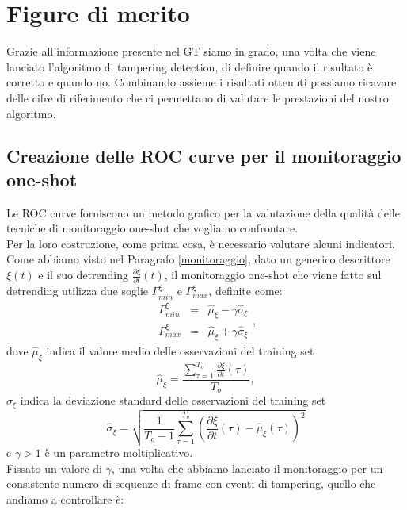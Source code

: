 \section{Figure di merito}
\label{figureDiMerito}
Grazie all'informazione presente nel GT siamo in grado, una volta che viene lanciato l'algoritmo di tampering detection, di definire quando il risultato \`e corretto e quando no.
Combinando assieme i risultati ottenuti possiamo ricavare delle cifre di riferimento che ci permettano di valutare le prestazioni del nostro algoritmo.
\subsection{Creazione delle ROC curve per il monitoraggio one-shot}
\label{metricheOneShot}
Le ROC curve forniscono un metodo grafico per la valutazione della qualit\`a delle tecniche di monitoraggio one-shot che vogliamo confrontare.\\
Per la loro costruzione, come prima cosa, \`e necessario valutare alcuni indicatori.
Come abbiamo visto nel Paragrafo \ref{monitoraggio}, dato un generico descrittore $\xi(t)$ e il suo detrending $\frac{\partial \xi}{\partial t}(t)$, il monitoraggio one-shot che viene fatto sul detrending utilizza due soglie $\Gamma_{min}^\xi$ e $\Gamma_{max}^\xi$, definite come:
\begin{equation}
	\label{eq:soglieGeneriche}
	\begin{array}{lcl}
	\Gamma_{min}^\xi & = & \hat{\mu}_\xi -\gamma \hat{\sigma}_\xi\\
	\Gamma_{max}^\xi & = & \hat{\mu}_\xi + \gamma \hat{\sigma}_\xi
	\end{array},
\end{equation}
dove $\hat{\mu}_\xi$ indica il valore medio delle osservazioni del training set
\begin{equation}
\hat{\mu}_\xi = \frac{\sum_{\tau = 1}^{T_{o}} \frac{\partial \xi}{\partial t}(\tau)}{T_{o}}, \nonumber
\end{equation}
$\hat{\sigma}_\xi$ indica la deviazione standard delle osservazioni del training set
\begin{equation}
\hat{\sigma}_\xi  = \sqrt{\frac{1}{T_{o}-1}\sum_{\tau=1}^{T_{o}}\left(\frac{\partial \xi}{\partial t}(\tau) - \hat{\mu}_\xi(\tau)\right)^2} \nonumber
\end{equation}
e $\gamma>1$ \`e un parametro moltiplicativo.\\
Fissato un valore di $\gamma$, una volta che abbiamo lanciato il monitoraggio per un consistente numero di sequenze di frame con eventi di tampering, quello che andiamo a controllare \`e:
